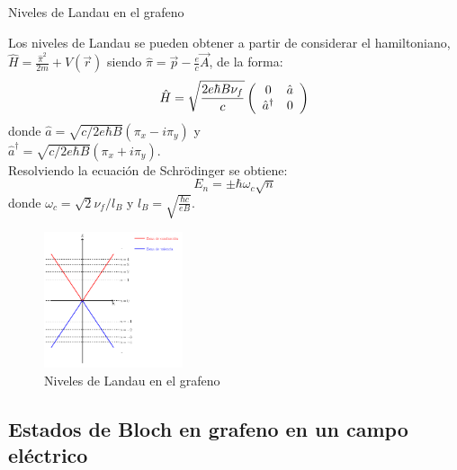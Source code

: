 \begin{frame}{Niveles de Landau en el grafeno}
	\begin{multicols}{2}
		\scriptsize{Los niveles de Landau se pueden obtener a partir de considerar el hamiltoniano,
			$\hat{H}=\frac{\hat{\pi}^2}{2m}+V(\vec{r})$ siendo $\hat{\pi}=\vec{p}- \frac{e}{c}\vec{A}$, de la forma:
			\begin{equation}
				\hat{H} = \sqrt{\frac{2e\hbar B \nu_f}{c}}
				\left( \begin{array}{c c}
					0&\hat{a}\\
					\hat{a}^\dagger&0
				\end{array} \right)
			\end{equation}
			donde $\hat{a}= \sqrt{c/2e\hbar B}(\pi_x-i\pi_y)$ y\\	$\hat{a}^\dagger=\sqrt{c/2e\hbar B}(\pi_x+i\pi_y)$.\\
			Resolviendo la ecuación de Schrödinger se obtiene:
			\begin{equation}
					E_n= \pm \hbar\omega_c \sqrt{n}
			\end{equation}
			donde $\omega_c = \sqrt{2}\nu_f/l_B$ y $l_B = \sqrt{\frac{\hbar c}{e B}}$.}
		\begin{figure}
			\includegraphics[height=4cm]{graficas/LL_grafeno.png}
			\caption{\scriptsize{Niveles de Landau en el grafeno}}
		\end{figure}
	\end{multicols}
\end{frame}

\subsection{Estados de Bloch en grafeno en un campo eléctrico}

